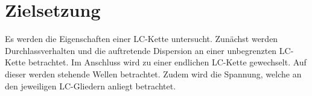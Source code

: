 
\section{Zielsetzung}
\label{sec:Zielsetzung}
Es werden die Eigenschaften einer LC-Kette untersucht. Zunächst werden Durchlassverhalten und die auftretende Dispersion an einer unbegrenzten LC-Kette betrachtet. Im Anschluss wird zu einer endlichen LC-Kette gewechselt. Auf dieser werden stehende Wellen betrachtet. Zudem wird die Spannung, welche an den jeweiligen LC-Gliedern anliegt betrachtet. 


